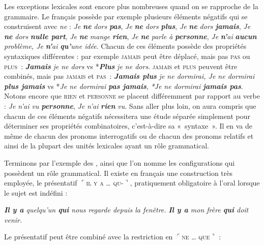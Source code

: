 {    Les exceptions lexicales sont encore plus nombreuses quand on se rapproche de la grammaire. Le français possède par exemple plusieurs éléments négatifs qui se construisent avec \textit{ne} : \textit{Je} \textbf{\textit{ne}} \textit{dors} \textbf{\textit{pas}}, \textit{Je} \textbf{\textit{ne}} \textit{dors} \textbf{\textit{plus}}, \textit{Je} \textbf{\textit{ne}} \textit{dors} \textbf{\textit{jamais}}, \textit{Je} \textbf{\textit{ne}} \textit{dors} \textbf{\textit{nulle part}}, \textit{Je} \textbf{\textit{ne}} \textit{mange} \textbf{\textit{rien}}, \textit{Je} \textbf{\textit{ne}} \textit{parle à} \textbf{\textit{personne}}, \textit{Je} \textbf{\textit{n’}}\textit{ai} \textbf{\textit{aucun}} \textit{problème, Je} \textbf{\textit{n’}}\textit{ai} \textbf{\textit{qu’}}\textit{une idée}. Chacun de ces éléments possède des propriétés syntaxiques différentes : par exemple \textsc{jamais} peut être déplacé, mais pas \textsc{pas} ou \textsc{plus~}: \textbf{\textit{Jamais}} \textit{je ne dors} vs *\textbf{\textit{Plus}} \textit{je ne dors}. \textsc{jamais} et \textsc{plus} peuvent être combinés, mais pas \textsc{jamais} et \textsc{pas~}: \textbf{\textit{Jamais plus}} \textit{je ne dormirai, Je ne dormirai} \textbf{\textit{plus jamais}} vs *\textit{Je ne dormirai} \textbf{\textit{pas jamais}}, \textit{*Je ne dormirai} \textbf{\textit{jamais pas}}. Notons encore que \textsc{rien} et \textsc{personne} se placent différemment par rapport au verbe : \textit{Je n’ai vu} \textbf{\textit{personne}}, \textit{Je n’ai} \textbf{\textit{rien}} \textit{vu}. Sans aller plus loin, on aura compris que chacun de ces éléments négatifs nécessitera une étude séparée simplement pour déterminer ses propriétés combinatoires, c’est-à-dire sa «~syntaxe~». Il en va de même de chacun des pronoms interrogatifs ou de chacun des pronoms relatifs et ainsi de la plupart des unités lexicales ayant un rôle grammatical.

    Terminons par l’exemple des , ainsi que l’on nomme les configurations qui possèdent un rôle grammatical. Il existe en français une construction très employée, le présentatif $⌜$\textsc{il y a … qu-}$⌝$, pratiquement obligatoire à l’oral lorsque le sujet est indéfini :

    \ea
    \ea 
    \textit{\textbf{{Il y a}} {quelqu’un} \textbf{{qui}} {nous regarde depuis la fenêtre.}}
    \ex
    \textit{\textbf{{Il y a}} {mon frère} \textbf{{qui}} {doit venir.}}
    \z
    \z

   \noindent Le présentatif peut être combiné avec la restriction en $⌜$\textsc{ne … que}$⌝$ :

}
